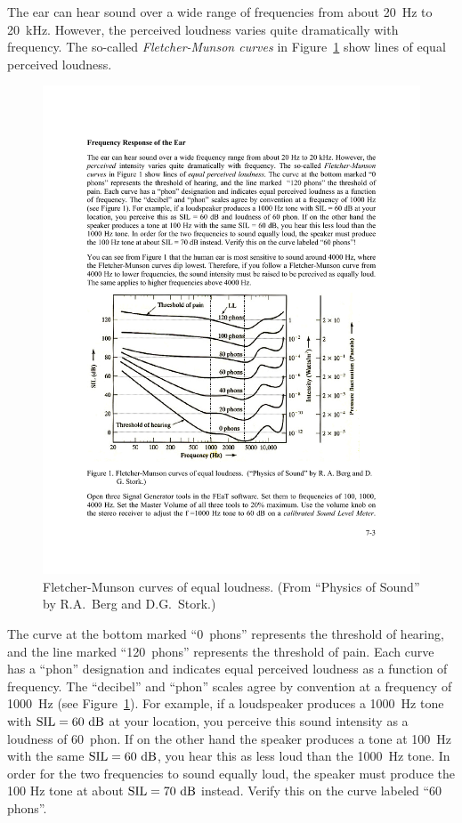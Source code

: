 \documentclass[11pt]{NSF}
\begin{document}
The ear can hear sound over a wide range of frequencies 
from about 20~Hz to 20~kHz. 
However, the perceived loudness varies quite dramatically
with frequency. The so-called {\em Fletcher-Munson curves} in
Figure~\ref{f:1} show
lines of equal perceived loudness. 
%
\begin{figure}[hbtp]
\begin{center}
\includegraphics[width=.9\textwidth]{fig7_1}
\caption{Fletcher-Munson curves of equal loudness. 
(From ``Physics of Sound” by R.A.~Berg and D.G.~Stork.)}
\label{f:1}
\end{center}
\end{figure}
%
The curve at the bottom marked 
``0~phons” represents the threshold of hearing, and the line marked 
``120~phons” represents the threshold of pain. 
Each curve has a ``phon” designation and
indicates equal perceived loudness as a function of frequency. 
The ``decibel” and ``phon” scales agree by convention at a frequency
of 1000~Hz (see Figure~\ref{f:1}). For example, if a loudspeaker produces a
1000~Hz tone with ${\rm SIL} = 60~{\rm dB}$ at your location, 
you perceive this sound intensity as a loudness  of 60~phon. 
If on the other hand the speaker produces
a tone at 100~Hz with the same ${\rm SIL} = 60~{\rm dB}$, 
you hear this as less loud than the 1000~Hz tone. 
In order for the two frequencies to sound
equally loud, the speaker must produce the 100 Hz tone at about 
${\rm SIL} = 70~{\rm dB}$ instead. 
Verify this on the curve labeled ``60 phons”.
\end{document}
